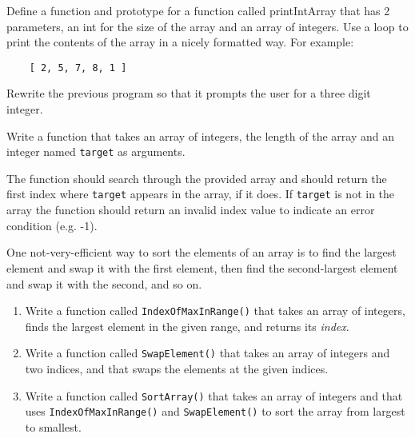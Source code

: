 


\begin{exercise}

Define a function and prototype for a function called printIntArray that has 2 parameters, an int for the size of the array and an array of integers. Use a loop to print the contents of the array in a nicely formatted way. For example:

\begin{verbatim}
	[ 2, 5, 7, 8, 1 ]
\end{verbatim}

\end{exercise}

\begin{exercise}
	
	Rewrite the previous program so that it prompts the user for a three digit integer. 
\end{exercise}


\begin{exercise}
Write a function that takes an array of integers, the length of the array and an integer named
{\tt target} as arguments. 

The function should search through the provided array and should return the first index where
{\tt target} appears in the array, if it does. If {\tt target} is not in the array the function should 
return an invalid index value to indicate an error condition  (e.g.  -1).
\end{exercise}


\begin{exercise}

One not-very-efficient way to sort the elements of an array
is to find the largest element and swap it with the first
element, then find the second-largest element and swap it with
the second, and so on.

\begin{enumerate}

\item Write a function called {\tt IndexOfMaxInRange()} that 
takes an array of integers, finds the
largest element in the given range, and returns its {\em index}.

\item Write a function called {\tt SwapElement()} that takes an
array of integers and two indices, and that swaps the elements
at the given indices.

\item Write a function called {\tt SortArray()} that takes an array of
integers and that uses {\tt IndexOfMaxInRange()} and {\tt SwapElement()}
to sort the array from largest to smallest.

\end{enumerate}
\end{exercise}


